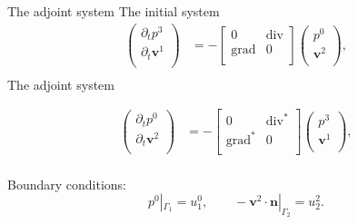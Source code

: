 \documentclass[aspectratio=169]{beamer}
\DeclareMathOperator*{\grad}{grad}
\renewcommand{\div}{\operatorname{div}}
\begin{document}
\begin{frame}{The adjoint system}
The initial system
	\begin{equation*}
		\begin{aligned}
			\begin{pmatrix}
				\partial_t p^3 \\
				\partial_t \bm{v}^1\\
			\end{pmatrix} &= 
			-\begin{bmatrix}
				0 & \div \\
				\grad & 0 \\
			\end{bmatrix}
			\begin{pmatrix}
				p^0\\
			 \bm{v}^2\\
			\end{pmatrix}, \\
		\end{aligned}	
	\end{equation*}
The adjoint system

\begin{equation*}
	\begin{aligned}
		\begin{pmatrix}
			\partial_t p^0 \\
			\partial_t \bm{v}^2\\
		\end{pmatrix} &= 
		-\begin{bmatrix}
			0 & \div^* \\
			\grad^* & 0 \\
		\end{bmatrix}
		\begin{pmatrix}
			p^3\\
			\bm{v}^1\\
		\end{pmatrix}, \\
	\end{aligned}	
\end{equation*}

Boundary conditions:
\begin{equation*}
		p^0|_{\Gamma_1} = u^0_1, \qquad
		-\bm{v}^2\cdot \bm{n}|_{\Gamma_2}  = u^{2}_2.
\end{equation*}

\end{frame}
\end{document}
